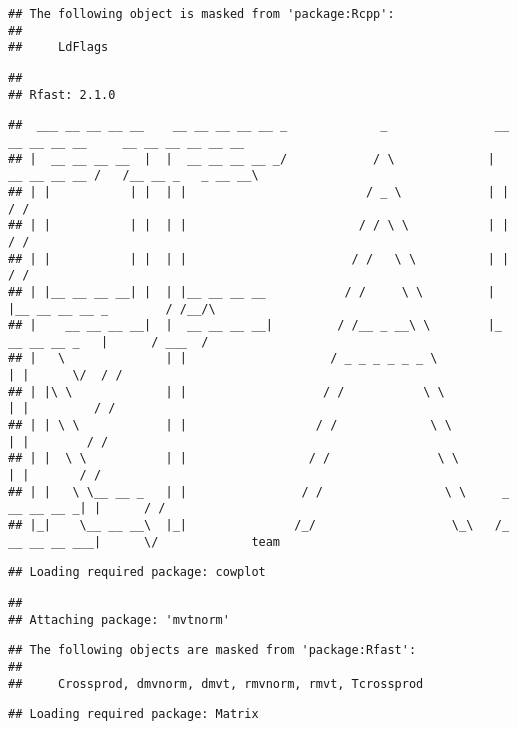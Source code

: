 \documentclass[
]{article}
\begin{document}
\begin{verbatim}
## The following object is masked from 'package:Rcpp':
## 
##     LdFlags
\end{verbatim}

\begin{verbatim}
## 
## Rfast: 2.1.0
\end{verbatim}

\begin{verbatim}
##  ___ __ __ __ __    __ __ __ __ __ _             _               __ __ __ __ __     __ __ __ __ __ __   
## |  __ __ __ __  |  |  __ __ __ __ _/            / \             |  __ __ __ __ /   /__ __ _   _ __ __\  
## | |           | |  | |                         / _ \            | |                        / /          
## | |           | |  | |                        / / \ \           | |                       / /          
## | |           | |  | |                       / /   \ \          | |                      / /          
## | |__ __ __ __| |  | |__ __ __ __           / /     \ \         | |__ __ __ __ _        / /__/\          
## |    __ __ __ __|  |  __ __ __ __|         / /__ _ __\ \        |_ __ __ __ _   |      / ___  /           
## |   \              | |                    / _ _ _ _ _ _ \                     | |      \/  / /       
## | |\ \             | |                   / /           \ \                    | |         / /          
## | | \ \            | |                  / /             \ \                   | |        / /          
## | |  \ \           | |                 / /               \ \                  | |       / /          
## | |   \ \__ __ _   | |                / /                 \ \     _ __ __ __ _| |      / /          
## |_|    \__ __ __\  |_|               /_/                   \_\   /_ __ __ __ ___|      \/             team
\end{verbatim}

\begin{verbatim}
## Loading required package: cowplot
\end{verbatim}

\begin{verbatim}
## 
## Attaching package: 'mvtnorm'
\end{verbatim}

\begin{verbatim}
## The following objects are masked from 'package:Rfast':
## 
##     Crossprod, dmvnorm, dmvt, rmvnorm, rmvt, Tcrossprod
\end{verbatim}

\begin{verbatim}
## Loading required package: Matrix
\end{verbatim}
\end{document}
